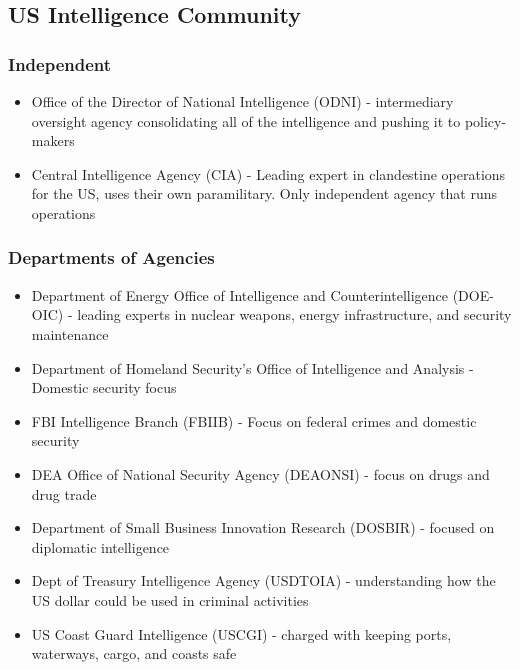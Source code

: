 \documentclass[11pt]{article}
\begin{document}
\subsection{US Intelligence Community}
\label{sec:org3e6971e}
\subsubsection{Independent}
\label{sec:orge4c24fa}
\begin{itemize}
\item Office of the Director of National Intelligence (ODNI) - intermediary oversight agency consolidating all of the intelligence and pushing it to policy-makers
\item Central Intelligence Agency (CIA) - Leading expert in clandestine operations for the US, uses their own paramilitary. Only independent agency that runs operations
\end{itemize}
\subsubsection{Departments of Agencies}
\label{sec:org85b5d3f}
\begin{itemize}
\item Department of Energy Office of Intelligence and Counterintelligence (DOE-OIC) - leading experts in nuclear weapons, energy infrastructure, and security maintenance
\item Department of Homeland Security's Office of Intelligence and Analysis - Domestic security focus
\item FBI Intelligence Branch (FBIIB) - Focus on federal crimes and domestic security
\item DEA Office of National Security Agency (DEAONSI) - focus on drugs and drug trade
\item Department of Small Business Innovation Research (DOSBIR) - focused on diplomatic intelligence
\item Dept of Treasury Intelligence Agency (USDTOIA) - understanding how the US dollar could be used in criminal activities
\item US Coast Guard Intelligence (USCGI) - charged with keeping ports, waterways, cargo, and coasts safe
\end{itemize}
\end{document}
